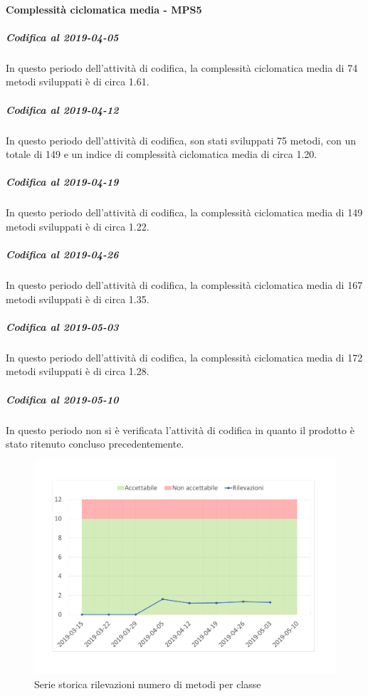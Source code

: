 \paragraph{Complessità ciclomatica media - MPS5}
\subparagraph{Codifica al 2019-04-05}
In questo periodo dell'attività di codifica, la complessità ciclomatica media di 74 metodi sviluppati è di circa 1.61. 

\subparagraph{Codifica al 2019-04-12}
In questo periodo dell'attività di codifica, son stati sviluppati 75 metodi, con un totale di 149 e un indice di complessità ciclomatica media di circa 1.20.

\subparagraph{Codifica al 2019-04-19}
In questo periodo dell'attività di codifica, la complessità ciclomatica media di 149 metodi sviluppati è di circa 1.22. 

\subparagraph{Codifica al 2019-04-26}
In questo periodo dell'attività di codifica, la complessità ciclomatica media di 167 metodi sviluppati è di circa 1.35. 

\subparagraph{Codifica al 2019-05-03}
In questo periodo dell'attività di codifica, la complessità ciclomatica media di 172 metodi sviluppati è di circa 1.28. 

\subparagraph{Codifica al 2019-05-10}
In questo periodo non si è verificata l'attività di codifica in quanto il prodotto è stato ritenuto concluso precedentemente.

\begin{figure}[H]
	\centering
	\includegraphics[scale=0.6]{images/resoconto/MPS5Chart.pdf}
	\caption{Serie storica rilevazioni numero di metodi per classe}	
\end{figure}


